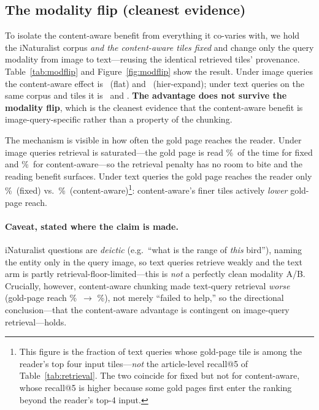 \documentclass[11pt]{article}
\begin{document}
\subsection{The modality flip (cleanest evidence)}\label{sec:modflip}
To isolate the content-aware benefit from everything it co-varies with, we hold the iNaturalist corpus
\emph{and the content-aware tiles fixed} and change only the query modality from image to text---reusing
the identical retrieved tiles' provenance. Table~\ref{tab:modflip} and Figure~\ref{fig:modflip} show the
result. Under image queries the content-aware effect is \CaImgFlatDelta\ (flat) and \CaImgHierDelta\
(hier-expand); under text queries on the same corpus and tiles it is \CaTxtFlatDelta\ and
\CaTxtHierDelta. \textbf{The advantage does not survive the modality flip}, which is the cleanest
evidence that the content-aware benefit is image-query-specific rather than a property of the chunking.

The mechanism is visible in how often the gold page reaches the reader. Under image queries retrieval is
saturated---the gold page is read \ImgFixedSawGold\%\ of the time for fixed and \ImgCaSawGold\%\ for
content-aware---so the retrieval penalty has no room to bite and the reading benefit surfaces. Under text
queries the gold page reaches the reader only \TxtFixedSawGold\%\ (fixed) vs.\ \TxtCaSawGold\%\
(content-aware)\footnote{This figure is the fraction of text queries whose gold-page tile is among the
reader's top four input tiles---\emph{not} the article-level recall@5 of Table~\ref{tab:retrieval}. The two
coincide for fixed but not for content-aware, whose recall@5 is higher because some gold pages first enter
the ranking beyond the reader's top-4 input.}: content-aware's finer tiles actively \emph{lower} gold-page reach.

\paragraph{Caveat, stated where the claim is made.} iNaturalist questions are \emph{deictic}
(e.g.\ ``what is the range of \emph{this} bird''), naming the entity only in the query image, so text
queries retrieve weakly and the text arm is partly retrieval-floor-limited---this is \emph{not} a
perfectly clean modality A/B. Crucially, however, content-aware chunking made text-query retrieval
\emph{worse} (gold-page reach \TxtFixedSawGold\%\ $\to$ \TxtCaSawGold\%), not merely ``failed to help,''
so the directional conclusion---that the content-aware advantage is contingent on image-query
retrieval---holds.
\end{document}
